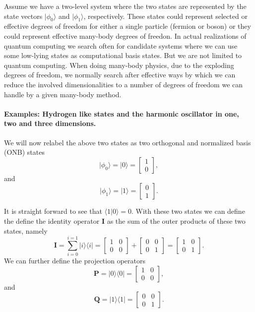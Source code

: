 Assume we have a two-level system where the two states are represented
by the state vectors $\vert \phi_0\rangle$ and $\vert \phi_1\rangle$,
respectively. These states could represent selected or effective
degrees of freedom for either a single particle (fermion or boson) or
they could represent effective many-body degrees of freedon. In actual
realizations of quantum computing we search often for candidate
systems where we can use some low-lying states as computational basis
states. But we are not limited to quantum computing. When doing
many-body physics, due to the exploding degrees of freedom, we
normally search after effective ways by which we can reduce the
involved dimensionalities to a number of degrees of freedom we can
handle by a given many-body method.

\paragraph{Examples: Hydrogen like states and the harmonic oscillator in one, two and three dimensions.}
We will now relabel the above two states as two orthogonal and normalized basis (ONB) states 
\[
\vert \phi_0 \rangle = \vert 0 \rangle = \begin{bmatrix} 1 \\ 0 \end{bmatrix},
\]
and 
\[
\vert \phi_1 \rangle = \vert 1 \rangle = \begin{bmatrix} 0 \\ 1 \end{bmatrix}.
\]

It is straight forward to see that $\langle 1 \vert 0\rangle=0$. With these two states we can define the define the identity operator $\bm{I}$ as the sum of the outer products of these two states, namely
\[
\bm{I} = \sum_{i=0}^{i=1}\vert i\rangle \langle i\vert = \begin{bmatrix} 1 & 0 \\ 0 & 0 \end{bmatrix} +\begin{bmatrix} 0 & 0 \\ 0 & 1 \end{bmatrix}=\begin{bmatrix} 1 & 0 \\ 0 & 1 \end{bmatrix}.
\]
We can further define the projection operators
\[
\bm{P} = \vert 0\rangle \langle 0\vert = \begin{bmatrix} 1 & 0 \\ 0 & 0 \end{bmatrix},
\]
and 
\[
\bm{Q} = \vert 1\rangle \langle 1\vert = \begin{bmatrix} 0 & 0 \\ 0 & 1 \end{bmatrix}.
\]

